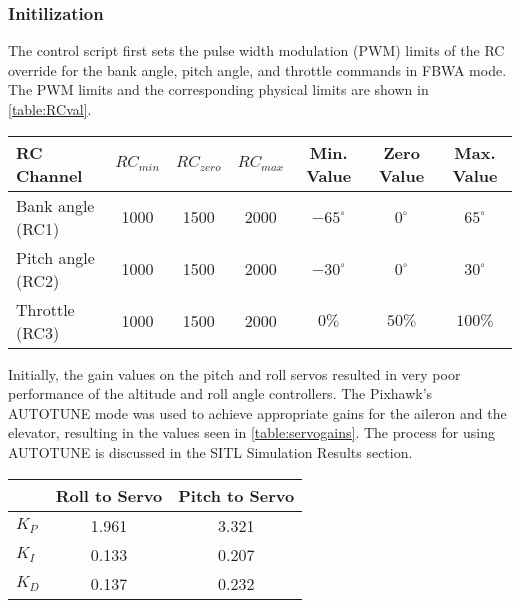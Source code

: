 \documentclass{aiaa}
\begin{document}

\subsubsection{Initilization}


The control script first sets the pulse width modulation (PWM) limits of the RC override for the bank angle, pitch angle, and throttle commands in FBWA mode. The PWM limits and the corresponding physical limits are shown in \ref{table:RCval}.

\begin{center}
\begin{tabular}{ l| c | c | c | c| c | c}
\label{table:RCval}
	
     RC Channel & $RC_{min}$ & $RC_{zero}$ & $RC_{max}$ & Min. Value & Zero Value & Max. Value \\
    \hline \hline
    Bank angle (RC1) & 1000 & 1500 & 2000 & $-65^{\circ}$ & $0^{\circ}$ & $65^{\circ}$\\
    \hline
    
    Pitch angle (RC2) & 1000 & 1500 & 2000 & $-30^{\circ}$ & $0^{\circ}$ & $30^{\circ}$\\
    \hline
    
    Throttle (RC3) & 1000 & 1500 & 2000 & $0\%$ & $50\%$ & $100\%$ \\
    \hline


\end{tabular}
\end{center}

Initially, the gain values on the pitch and roll servos resulted in very poor performance of the altitude and roll angle controllers. The Pixhawk's AUTOTUNE mode was used to achieve appropriate gains for the aileron and the elevator, resulting in the values seen in \ref{table:servogains}. The process for using AUTOTUNE is discussed in the SITL Simulation Results section.

\begin{center}
\begin{tabular}{ l| c | c }
\label{table:servogains}
	
      & Roll to Servo & Pitch to Servo \\
    \hline \hline
    $K_P$ & 1.961 & 3.321\\
    \hline
    
    $K_I$ & 0.133 & 0.207 \\
    \hline
    
    $K_D$ & 0.137 & 0.232 \\
    \hline


\end{tabular}
\end{center}
\end{document}
